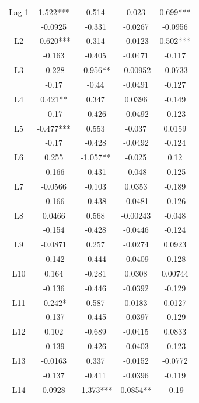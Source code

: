 \documentclass[]{ecca}
\begin{document}
\begin{center}
\begin{longtable}{ccccc}
		Lag 1        & 1.522***  & 0.514     & 0.023    & 0.699***  \\
		& -0.0925   & -0.331    & -0.0267  & -0.0956   \\
		L2           & -0.620*** & 0.314     & -0.0123  & 0.502***  \\
		& -0.163    & -0.405    & -0.0471  & -0.117    \\
		L3           & -0.228    & -0.956**  & -0.00952 & -0.0733   \\
		& -0.17     & -0.44     & -0.0491  & -0.127    \\
		L4           & 0.421**   & 0.347     & 0.0396   & -0.149    \\
		& -0.17     & -0.426    & -0.0492  & -0.123    \\
		L5           & -0.477*** & 0.553     & -0.037   & 0.0159    \\
		& -0.17     & -0.428    & -0.0492  & -0.124    \\
		L6           & 0.255     & -1.057**  & -0.025   & 0.12      \\
		& -0.166    & -0.431    & -0.048   & -0.125    \\
		L7           & -0.0566   & -0.103    & 0.0353   & -0.189    \\
		& -0.166    & -0.438    & -0.0481  & -0.126    \\
		L8           & 0.0466    & 0.568     & -0.00243 & -0.048    \\
		& -0.154    & -0.428    & -0.0446  & -0.124    \\
		L9           & -0.0871   & 0.257     & -0.0274  & 0.0923    \\
		& -0.142    & -0.444    & -0.0409  & -0.128    \\
		L10          & 0.164     & -0.281    & 0.0308   & 0.00744   \\
		& -0.136    & -0.446    & -0.0392  & -0.129    \\
		L11          & -0.242*   & 0.587     & 0.0183   & 0.0127    \\
		& -0.137    & -0.445    & -0.0397  & -0.129    \\
		L12          & 0.102     & -0.689    & -0.0415  & 0.0833    \\
		& -0.139    & -0.426    & -0.0403  & -0.123    \\
		L13          & -0.0163   & 0.337     & -0.0152  & -0.0772   \\
		& -0.137    & -0.411    & -0.0396  & -0.119    \\
		L14          & 0.0928    & -1.373*** & 0.0854** & -0.19     \\

\end{longtable}
\end{center}
\end{document}
